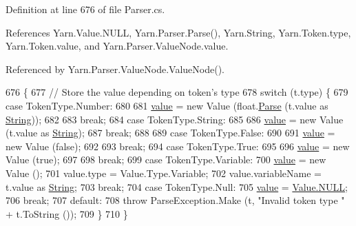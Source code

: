 Definition at line 676 of file Parser.\-cs.



References Yarn.\-Value.\-N\-U\-L\-L, Yarn.\-Parser.\-Parse(), Yarn.\-String, Yarn.\-Token.\-type, Yarn.\-Token.\-value, and Yarn.\-Parser.\-Value\-Node.\-value.



Referenced by Yarn.\-Parser.\-Value\-Node.\-Value\-Node().


\begin{DoxyCode}
676                                            \{
677                 \textcolor{comment}{// Store the value depending on token's type}
678                 \textcolor{keywordflow}{switch} (t.type) \{
679                 \textcolor{keywordflow}{case} TokenType.Number:
680 
681                     \hyperlink{a00178_a51ab5939344f9bfa21181c02cf0e341d}{value} = \textcolor{keyword}{new} Value (\textcolor{keywordtype}{float}.\hyperlink{a00139_a811cc7226f4f4a2f3440cdb67ad14468}{Parse} (t.value as \hyperlink{a00041_a301aa7c866593a5b625a8fc158bbeacea27118326006d3829667a400ad23d5d98}{String}));
682 
683                     \textcolor{keywordflow}{break};
684                 \textcolor{keywordflow}{case} TokenType.String:
685 
686                     \hyperlink{a00178_a51ab5939344f9bfa21181c02cf0e341d}{value} = \textcolor{keyword}{new} Value (t.value as \hyperlink{a00041_a301aa7c866593a5b625a8fc158bbeacea27118326006d3829667a400ad23d5d98}{String});
687                     \textcolor{keywordflow}{break};
688 
689                 \textcolor{keywordflow}{case} TokenType.False:
690 
691                     \hyperlink{a00178_a51ab5939344f9bfa21181c02cf0e341d}{value} = \textcolor{keyword}{new} Value (\textcolor{keyword}{false});
692 
693                     \textcolor{keywordflow}{break};
694                 \textcolor{keywordflow}{case} TokenType.True:
695 
696                     \hyperlink{a00178_a51ab5939344f9bfa21181c02cf0e341d}{value} = \textcolor{keyword}{new} Value (\textcolor{keyword}{true});
697 
698                     \textcolor{keywordflow}{break};
699                 \textcolor{keywordflow}{case} TokenType.Variable:
700                     \hyperlink{a00178_a51ab5939344f9bfa21181c02cf0e341d}{value} = \textcolor{keyword}{new} Value ();
701                     value.type = Value.Type.Variable;
702                     value.variableName = t.value as \hyperlink{a00041_a301aa7c866593a5b625a8fc158bbeacea27118326006d3829667a400ad23d5d98}{String};
703                     \textcolor{keywordflow}{break};
704                 \textcolor{keywordflow}{case} TokenType.Null:
705                     \hyperlink{a00178_a51ab5939344f9bfa21181c02cf0e341d}{value} = \hyperlink{a00177_a1ed2964965baca8621c45efa23f37660}{Value.NULL};
706                     \textcolor{keywordflow}{break};
707                 \textcolor{keywordflow}{default}:
708                     \textcolor{keywordflow}{throw} ParseException.Make (t, \textcolor{stringliteral}{"Invalid token type "} + t.ToString ());
709                 \}
710             \}
\end{DoxyCode}


